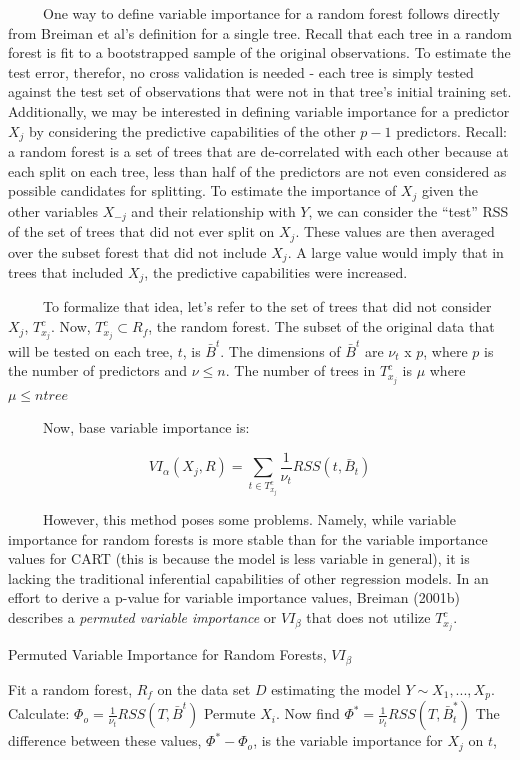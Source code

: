 \documentclass[12pt,twoside]{reedthesis}
\begin{document}
  ~~~~~One way to define variable importance for a random forest follows
  directly from Breiman et al's definition for a single tree. Recall that
  each tree in a random forest is fit to a bootstrapped sample of the
  original observations. To estimate the test error, therefor, no cross
  validation is needed - each tree is simply tested against the test set
  of observations that were not in that tree's initial training set.
  Additionally, we may be interested in defining variable importance for a
  predictor \(X_j\) by considering the predictive capabilities of the
  other \(p-1\) predictors. Recall: a random forest is a set of trees that
  are de-correlated with each other because at each split on each tree,
  less than half of the predictors are not even considered as possible
  candidates for splitting. To estimate the importance of \(X_j\) given
  the other variables \(X_{-j}\) and their relationship with \(Y\), we can
  consider the ``test'' RSS of the set of trees that did not ever split on
  \(X_j\). These values are then averaged over the subset forest that did
  not include \(X_j\). A large value would imply that in trees that
  included \(X_j\), the predictive capabilities were increased.
  
  ~~~~~To formalize that idea, let's refer to the set of trees that did
  not consider \(X_j\), \(T_{x_j}^c\). Now, \(T_{x_j}^c \subset R_f\), the
  random forest. The subset of the original data that will be tested on
  each tree, \(t\), is \(\bar{B}^t\). The dimensions of \(\bar{B}^t\) are
  \(\nu_t\) x \(p\), where \(p\) is the number of predictors and
  \(\nu \leq n\). The number of trees in \(T_{x_j}^c\) is \(\mu\) where
  \(\mu \leq ntree\)
  
  ~~~~~Now, base variable importance is:
  
  \[VI_{\alpha}(X_j, R) =  \sum_{t \in T_{x_j}^c} \frac 1 {\nu_t} RSS(t,\bar{B}_t)\]
  
  ~~~~~However, this method poses some problems. Namely, while variable
  importance for random forests is more stable than for the variable
  importance values for CART (this is because the model is less variable
  in general), it is lacking the traditional inferential capabilities of
  other regression models. In an effort to derive a p-value for variable
  importance values, Breiman (2001b) describes a \emph{permuted variable
  importance} or \(VI_{\beta}\) that does not utilize \(T_{x_j}^c\).
  
  \begin{algorithm}
  \caption{Permuted Variable Importance for Random Forests, $VI_{\beta}$}
  \label{breiman}
  \begin{algorithmic}
  \State Fit a random forest, $R_f$ on the data set $D$ estimating the model $Y \sim X_1,...,X_p$.
  \State Calculate: $\Phi_o =  \frac 1 {\nu_t} RSS(T,\bar{B}^t)$
  \State Permute $X_i$. Now find $\Phi^* =  \frac 1 {\nu_t} RSS(T,\bar{B}_t^*)$
  \State The difference between these values, $\Phi^* - \Phi_o$,  is the variable importance for $X_j$ on $t$,  
  \EndFor
  \EndFor
  \end{algorithmic}
  \end{algorithm}
  
\end{document}
